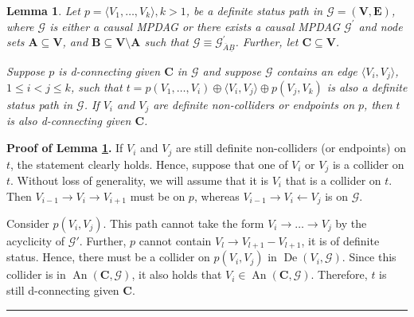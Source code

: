 \documentclass[11pt]{article}
\DeclareMathOperator{\An}{An}
\DeclareMathOperator{\De}{De}
\newcommand{\BlackBox}{\rule{1.5ex}{1.5ex}}  %
\newtheorem{lemma}[theorem]{Lemma}
\newcommand{\mb}[1]{\mathbf{#1}}
\newcommand{\g}[1][G]{\mathcal{#1}}
\newenvironment{proofof}[1][]{\noindent \textbf{Proof of #1.}}{\hfill\BlackBox}
\begin{document}
\begin{lemma}
\label{lem:helper-for-annoying-case}
    Let $p = \langle V_1, \dots, V_k \rangle, k> 1$, be a definite status path in $\g = (\mb{V, E})$, where $\g$ is either a causal MPDAG or there exists a causal MPDAG $\g^{'}$ and node sets $\mb{A} \subseteq \mb{V}$, and $\mb{B} \subseteq \mb{V} \setminus \mb{A}$ such that $\g \equiv \g^{'}_{\overline{A} \underline{B}}$. Further, let $\mb{C} \subseteq \mb{V}$.

    Suppose $p$ is d-connecting given $\mb{C}$ in $\g$ and suppose $\g$ contains an edge $\langle V_i, V_j \rangle$, $1 \le i < j \le k$, such that $t = p(V_1, \dots, V_i) \oplus \langle V_i, V_j \rangle \oplus p(V_j, V_k)$ is also a definite status path in $\g$. If $V_i$ and $V_j$ are definite non-colliders or endpoints on $p$, then $t$ is also d-connecting given $\mb{C}$.
\end{lemma}

\begin{proofof}[Lemma \ref{lem:helper-for-annoying-case}]
    If $V_i$ and $V_j$ are still definite non-colliders (or endpoints) on $t$, the statement clearly holds. Hence, suppose that one of $V_i$ or $V_j$ is a collider on $t$. Without loss of generality, we will assume that it is $V_i$ that is a collider on $t$. Then $V_{i-1} \to V_i \to V_{i+1}$ must be on $p$, whereas $V_{i-1} \to V_i \gets V_j$ is on $\g$. 

    Consider $p(V_i, V_j)$. This path cannot take the form $V_i \to \dots \to V_j$ by the acyclicity of $\g'$. Further, $p$ cannot contain $V_l \to V_{l+1} - V_{l+1}$, it is of definite status. Hence, there must be a collider on $p(V_i, V_j)$ in $\De(V_i,\g)$. Since this collider is in $\An (\mb{C}, \g)$, it also holds that $V_i \in \An(\mb{C}, \g)$. Therefore, $t$ is still d-connecting given $\mb{C}$.
\end{proofof}





\end{document}
